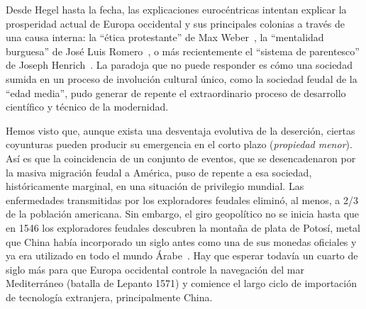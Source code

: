 \documentclass[a4paper,11pt]{book}
\theoremstyle{definition}
\begin{document}
Desde Hegel hasta la fecha, las explicaciones euroc\'entricas intentan explicar la prosperidad actual de Europa occidental y sus principales colonias a trav\'es de una causa interna: la ``\'etica protestante'' de Max Weber~\cite{weber1905-eticaProtestante}, la ``mentalidad burguesa'' de Jos\'e Luis Romero~\cite{romero1967-revolucionBurguesa}, o m\'as recientemente el ``sistema de parentesco'' de Joseph Henrich~\cite{henrich2020-weirdest}.
%
La paradoja que no puede responder es c\'omo una sociedad sumida en un proceso de involuci\'on cultural \'unico, como la sociedad feudal de la ``edad media'', pudo generar de repente el extraordinario proceso de desarrollo cient\'ifico y t\'ecnico de la modernidad.


Hemos visto que, aunque exista una desventaja evolutiva de la deserci\'on, ciertas coyunturas pueden producir su emergencia en el corto plazo (\emph{propiedad menor}).
%
As\'i es que la coincidencia de un conjunto de eventos, que se desencadenaron por la masiva migraci\'on feudal a Am\'erica, puso de repente a esa sociedad, hist\'oricamente marginal, en una situaci\'on de privilegio mundial.
%
Las enfermedades transmitidas por los exploradores feudales elimin\'o, al menos, a 2/3 de la poblaci\'on americana.
%
Sin embargo, el giro geopol\'itico no se inicia hasta que en 1546 los exploradores feudales descubren la monta\~na de plata de Potos\'i, metal que China hab\'ia incorporado un siglo antes como una de sus monedas oficiales y ya era utilizado en todo el mundo \'Arabe~\cite{pomeranz2018-tradeCreated, pomeranz2000-divergence}.
%
Hay que esperar todav\'ia un cuarto de siglo m\'as para que Europa occidental controle la navegaci\'on del mar Mediterr\'aneo (batalla de Lepanto 1571) y comience el largo ciclo de importaci\'on de tecnolog\'ia extranjera, principalmente China.

\end{document}

